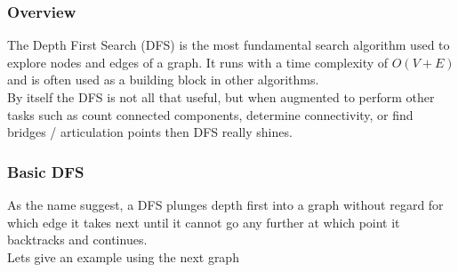 \subsubsection{Overview}
The Depth First Search (DFS) is the most fundamental search algorithm used to explore nodes and edges of a graph. It runs with a time complexity of $O(V+E)$ and is often used as a building block in other algorithms.\\

By itself the DFS is not all that useful, but when augmented to perform other tasks such as count connected components, determine connectivity, or find bridges / articulation points then DFS really shines.


\subsubsection{Basic DFS}
As the name suggest, a DFS plunges depth first into a graph without regard for which edge it takes next until it cannot go any further at which point it backtracks and continues.\\

Lets give an example using the next graph

